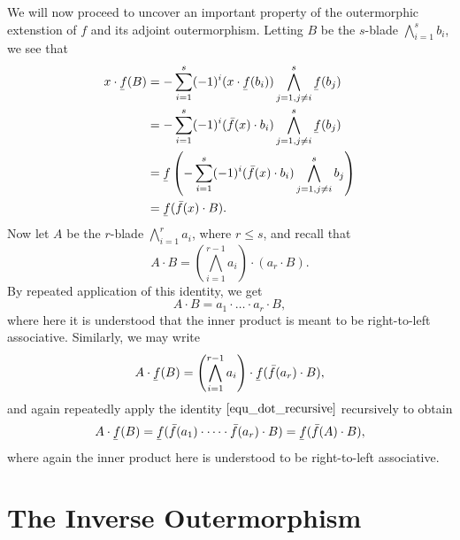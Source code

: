 \documentclass[12pt]{article}
\newcommand{\uf}{\underaccent{\bar}{f}}
\newcommand{\of}{\bar{f}}
\begin{document}
We will now proceed to uncover an important property of the outermorphic extenstion
of $f$ and its adjoint outermorphism.  Letting $B$ be the $s$-blade $\bigwedge_{i=1}^s b_i$,
we see that
\begin{align*}
x\cdot \uf(B) &= -\sum_{i=1}^s(-1)^i(x\cdot\uf(b_i))\bigwedge_{j=1,j\neq i}^s\uf(b_j) \\
 &= -\sum_{i=1}^s(-1)^i(\of(x)\cdot b_i)\bigwedge_{j=1,j\neq i}^s\uf(b_j) \\
 &= \uf\left(-\sum_{i=1}^s(-1)^i(\of(x)\cdot b_i)\bigwedge_{j=1,j\neq i}^s b_j\right) \\
 &= \uf(\of(x)\cdot B).
\end{align*}
Now let $A$ be the $r$-blade $\bigwedge_{i=1}^r a_i$, where $r\leq s$, and recall
that
\begin{equation}\label{equ_dot_recursive}
A\cdot B = \left(\bigwedge_{i=1}^{r-1} a_i\right)\cdot(a_r\cdot B).
\end{equation}
By repeated application of this identity, we get
\begin{equation*}
A\cdot B = a_1\cdot\dots\cdot a_r\cdot B,
\end{equation*}
where here it is understood that the inner product is meant to be right-to-left associative.
Similarly, we may write
\begin{equation*}
A\cdot\uf(B) = \left(\bigwedge_{i=1}^{r-1}a_i\right)\cdot\uf(\of(a_r)\cdot B),
\end{equation*}
and again repeatedly apply the identity $\eqref{equ_dot_recursive}$ recursively
to obtain
\begin{equation*}
A\cdot\uf(B) = \uf(\of(a_1)\cdot\dots\cdot\of(a_r)\cdot B) = \uf(\of(A)\cdot B),
\end{equation*}
where again the inner product here is understood to be right-to-left associative.

\section{The Inverse Outermorphism}
\end{document}
